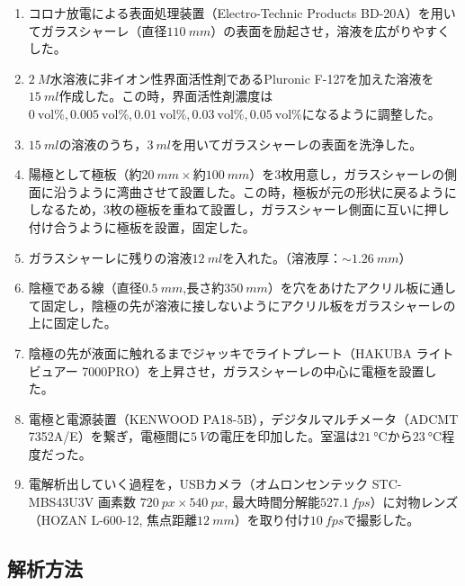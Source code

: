 \documentclass[autodetect-engine,dvi=dvipdfmx,a4paper,ja=standard,oneside,openany,11pt]{bxjsbook}
\begin{document}
\begin{enumerate}
  \item コロナ放電による表面処理装置（Electro-Technic Products BD-20A）を用いてガラスシャーレ（直径$\SI{110}{mm}$）の表面を励起させ，溶液を広がりやすくした。
  \item {} $\SI{2}{M}$水溶液に非イオン性界面活性剤であるPluronic F-127を加えた溶液を$\SI{15}{ml}$作成した。この時，界面活性剤濃度は$\SI{0}{\mathrm{vol}\%}, \SI{0.005}{\mathrm{vol}\%}, \SI{0.01}{\mathrm{vol}\%}, \SI{0.03}{\mathrm{vol}\%}, \SI{0.05}{\mathrm{vol}\%}$になるように調整した。
  \item $\SI{15}{ml}$の溶液のうち，$\SI{3}{ml}$を用いてガラスシャーレの表面を洗浄した。
  \item 陽極として極板（約$\SI{20}{mm}\times$約$\SI{100}{mm}$）を3枚用意し，ガラスシャーレの側面に沿うように湾曲させて設置した。この時，極板が元の形状に戻るようにしなるため，3枚の極板を重ねて設置し，ガラスシャーレ側面に互いに押し付け合うように極板を設置，固定した。
  \item ガラスシャーレに残りの溶液$\SI{12}{ml}$を入れた。（溶液厚：$\sim\SI{1.26}{mm}$）
  \item 陰極である線（直径$\SI{0.5}{mm}$,長さ約$\SI{350}{mm}$）を穴をあけたアクリル板に通して固定し，陰極の先が溶液に接しないようにアクリル板をガラスシャーレの上に固定した。
  \item 陰極の先が液面に触れるまでジャッキでライトプレート（HAKUBA ライトビュアー 7000PRO）を上昇させ，ガラスシャーレの中心に電極を設置した。
  \item 電極と電源装置（KENWOOD PA18-5B），デジタルマルチメータ（ADCMT 7352A/E）を繋ぎ，電極間に$\SI{5}{V}$の電圧を印加した。室温は$\SI{21}{\degreeCelsius}$から$\SI{23}{\degreeCelsius}$程度だった。
  \item 電解析出していく過程を，USBカメラ（オムロンセンテック STC-MBS43U3V 画素数 $\SI{720}{px} \times \SI{540}{px}$, 最大時間分解能$\SI{527.1}{fps}$）に対物レンズ（HOZAN L-600-12, 焦点距離$\SI{12}{mm}$）を取り付け$\SI{10}{fps}$で撮影した。
\end{enumerate}


\subsection{解析方法}
\end{document}
